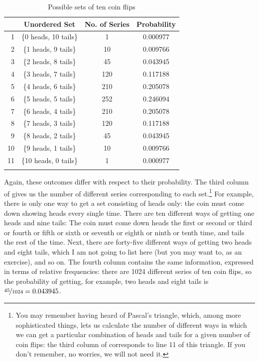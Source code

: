 \begin{table}
\caption{Possible sets of ten coin flips}
\label{tab:tencoinflips}
\begin{tabular}[t]{rccS[table-format=1.6,round-precision=6]}
\lsptoprule & Unordered Set & No. of Series & {Probability}\\
 & \{0 heads, 10 tails\} & 1 & 0.000977 \\
2 & \{1 heads, 9 tails\} & 10 & 0.009766 \\
3 & \{2 heads, 8 tails\} & 45 & 0.043945 \\
4 & \{3 heads, 7 tails\} & 120 & 0.117188 \\
5 & \{4 heads, 6 tails\} & 210 & 0.205078 \\
6 & \{5 heads, 5 tails\} & 252 & 0.246094 \\
7 & \{6 heads, 4 tails\} & 210 & 0.205078 \\
8 & \{7 heads, 3 tails\} & 120 & 0.117188 \\
9 & \{8 heads, 2 tails\} & 45 & 0.043945 \\
10 & \{9 heads, 1 tails\} & 10 & 0.009766 \\
11 & \{10 heads, 0 tails\} & 1 & 0.000977 \\
\lspbottomrule
\end{tabular}
\end{table}

Again, these outcomes differ with respect to their probability.  The third column of  gives us the number of different series corresponding to each set.\footnote{You may remember having heard of Pascal's triangle, which, among more sophisticated things, lets us calculate the number of different ways in which we can get a particular combination of heads and tails for a given number of coin flips: the third column of  corresponds to line 11 of this triangle. If you don't remember, no worries, we will not need it.} For example, there is only one way to get a set consisting of heads only: the coin must come down showing heads every single time. There are ten different ways of getting one heads and nine tails: The coin must come down heads the first or second or third or fourth or fifth or sixth or seventh or eighth or ninth or tenth time, and tails the rest of the time. Next, there are forty\hyp{}five different ways of getting two heads and eight tails, which I am not going to list here (but you may want to, as an exercise), and so on. The fourth column contains the same information, expressed in terms of relative frequencies:  there are 1024 different series of ten coin flips, so the probability  of getting, for example, two heads and eight tails is $\nicefrac{45}{1024} = 0.043945$.

